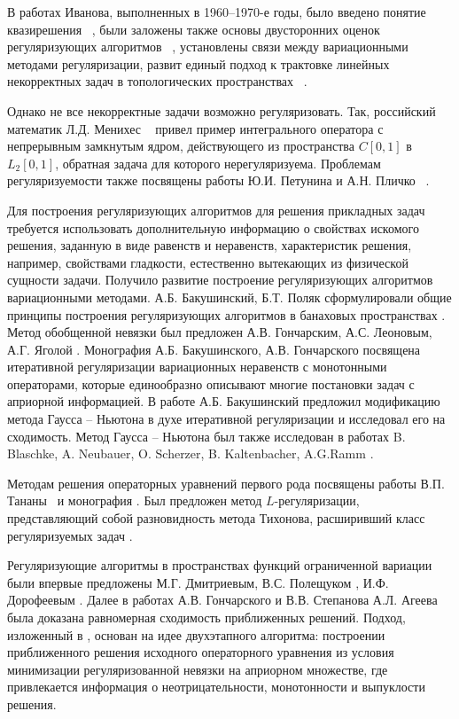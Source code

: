 {В работах Иванова, выполненных в 1960--1970-е годы, было введено понятие квазирешения ~\cite{Iv1962_2, Iv1963}, были заложены также основы двусторонних оценок регуляризующих алгоритмов ~\cite{Iv1966}, установлены связи между вариационными методами регуляризации, развит единый подход к трактовке линейных некорректных задач в топологических пространствах ~\cite{Iv1967}. 

Однако не все некорректные задачи возможно регуляризовать. Так, российский математик Л.Д. Менихес ~\cite{Menih1978} привел пример интегрального оператора с непрерывным замкнутым ядром, действующего из пространства \( C[0,1] \) в \( L_2[0,1] \), обратная задача для которого нерегуляризуема. Проблемам регуляризуемости также посвящены работы Ю.И. Петунина и А.Н. Пличко ~\cite{PetPlich1980}.

Для построения регуляризующих алгоритмов для решения прикладных задач требуется использовать дополнительную информацию о свойствах искомого решения, заданную в виде равенств и неравенств, характеристик решения, например, свойствами гладкости, естественно вытекающих из физической сущности задачи. Получило развитие построение регуляризующих алгоритмов вариационными методами. А.Б. Бакушинский, Б.Т. Поляк сформулировали общие принципы построения регуляризующих алгоритмов в банаховых пространствах \cite{BakPol1974}. Метод обобщенной невязки был предложен А.В. Гончарским, А.С. Леоновым, А.Г. Яголой \cite{GonLeoYag1973}.  Монография А.Б. Бакушинского, А.В. Гончарского \cite{BakGon1989} посвящена итеративной регуляризации вариационных неравенств с монотонными операторами, которые единообразно описывают многие постановки задач с априорной информацией. В работе \cite{Bak1992} А.Б. Бакушинский предложил модификацию метода Гаусса -- Ньютона в духе итеративной регуляризации и исследовал его на сходимость. Метод
Гаусса -- Ньютона был также исследован в работах B. Blaschke, A. Neubauer, O. Scherzer, B. Kaltenbacher, A.G.Ramm \cite{BlaNeuSch1997,KalNeuRam2002}.

Методам решения операторных уравнений первого рода посвящены работы В.П. Тананы~\cite{Tan1977, Tan1997} и монография \cite{Tan1981}. Был предложен метод $L$-регуляризации, представляющий собой разновидность метода Тихонова, расширивший класс регуляризуемых задач \cite{Tan2003_1,Tan2003_2}.

Регуляризующие алгоритмы в пространствах функций ограниченной вариации были впервые предложены М.Г. Дмитриевым, В.С. Полещуком \cite{DmiPol1972}, И.Ф. Дорофеевым \cite{Dor1979}. Далее в работах А.В. Гончарского и В.В. Степанова \cite{GonSte1979} А.Л. Агеева \cite{Ag1980} была доказана равномерная сходимость приближенных решений. Подход, изложенный в \cite{TikhGonSteYag1990}, основан на идее двухэтапного алгоритма: построении приближенного решения  исходного операторного уравнения из условия минимизации регуляризованной невязки на априорном множестве, где привлекается информация о неотрицательности, монотонности и выпуклости решения. %

}

